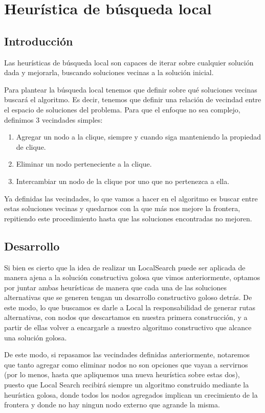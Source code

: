 \section{Heurística de búsqueda local}
\subsection{Introducción}
Las heurísticas de búsqueda local son capaces de iterar sobre cualquier solución dada y
mejorarla, buscando soluciones vecinas a la solución inicial.

Para plantear la búsqueda local tenemos que definir sobre qué soluciones vecinas buscará el algoritmo. Es decir, tenemos que definir una relación de vecindad entre el espacio de soluciones del problema. Para que el enfoque no sea complejo, definimos 3 vecindades simples:

\begin{enumerate}
	\item Agregar un nodo a la clique, siempre y cuando siga manteniendo la propiedad de clique.

	\item Eliminar un nodo perteneciente a la clique.

	\item Intercambiar un nodo de la clique por uno que no pertenezca a ella.

\end{enumerate}

Ya definidas las vecindades, lo que vamos a hacer en el algoritmo es buscar entre estas soluciones vecinas y quedarnos con la que más nos mejore la frontera, repitiendo este procedimiento hasta que las soluciones encontradas no mejoren.


\subsection{Desarrollo}
Si bien es cierto que la idea de realizar un LocalSearch puede ser aplicada de manera ajena a la solución constructiva golosa que vimos anteriormente, optamos por juntar ambas heurísticas de manera que cada una de las soluciones alternativas que se generen tengan un desarrollo constructivo goloso detrás. De este modo, lo que buscamos es darle a Local la responsabilidad de generar rutas alternativas, con nodos que descartamos en nuestra primera construcción, y a partir de ellas volver a encargarle a nuestro algoritmo constructivo que alcance una solución golosa.

De este modo, si repasamos las vecindades definidas anteriormente, notaremos que tanto agregar como eliminar nodos no son opciones que vayan a servirnos (por lo menos, hasta que apliquemos una nueva heurística sobre estas dos), puesto que Local Search recibirá siempre un algoritmo construido mediante la heurística golosa, donde todos los nodos agregados implican un crecimiento de la frontera y donde no hay ningun nodo externo que agrande la misma.

